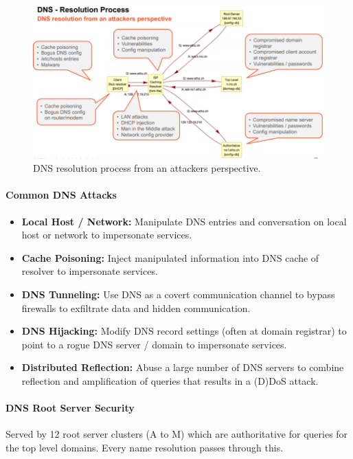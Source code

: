 \begin{figure}[h]
	\centering
	\includegraphics[scale=0.8]{images/915-attack.PNG}
	\caption{DNS resolution process from an attackers perspective.}
	\label{fig:attack}
\end{figure}

\paragraph{Common DNS Attacks}
\begin{itemize}
    \item \textbf{Local Host / Network:} Manipulate DNS entries and conversation on local host or network to impersonate services.
    \item \textbf{Cache Poisoning:} Inject manipulated information into DNS cache of resolver to impersonate services.
    \item \textbf{DNS Tunneling:} Use DNS as a covert communication channel to bypass firewalls to exfiltrate data and hidden communication.
    \item \textbf{DNS Hijacking:} Modify DNS record settings (often at domain registrar) to point to a rogue DNS server / domain to impersonate services.
    \item \textbf{Distributed Reflection:} Abuse a large number of DNS servers to combine reflection and amplification of queries that results in a (D)DoS attack.
\end{itemize}

\paragraph{DNS Root Server Security}
Served by 12 root server clusters (A to M) which are authoritative for queries for the top level domains. Every name resolution passes through this.

